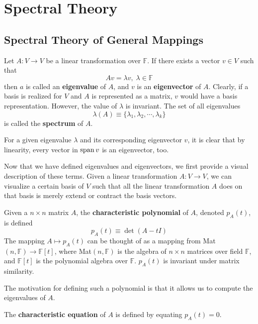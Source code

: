 \section{Spectral Theory} 

\subsection{Spectral Theory of General Mappings}

  \begin{definition}
    Let $A: V \longrightarrow V$ be a linear transformation over $\mathbb{F}$. If there exists a vector $v \in V$ such that
    \[ A v = \lambda v, \; \lambda \in \mathbb{F}\]
    then $a$ is called an \textbf{eigenvalue} of $A$, and $v$ is an \textbf{eigenvector} of $A$. Clearly, if a basis is realized for $V$ and $A$ is represented as a matrix, $v$ would have a basis representation. However, the value of $\lambda$ is invariant. The set of all eigenvalues 
    \[\lambda(A) \equiv \{ \lambda_1, \lambda_2, \cdots, \lambda_k\}\]
    is called the \textbf{spectrum} of $A$. 
  \end{definition}

  For a given eigenvalue $\lambda$ and its corresponding eigenvector $v$, it is clear that by linearity, every vector in $\operatorname{span} v$ is an eigenvector, too. 

  Now that we have defined eigenvalues and eigenvectors, we first provide a visual description of these terms. Given a linear transformation $A: V \longrightarrow V$, we can visualize a certain basis of $V$ such that all the linear transformation $A$ does on that basis is merely extend or contract the basis vectors.

  \begin{definition}
    Given a $n \times n$ matrix $A$, the \textbf{characteristic polynomial} of $A$, denoted $p_A (t)$, is defined
    \[ p_A (t) \equiv \det{(A - t I)}\]
    The mapping $A \mapsto p_A (t)$ can be thought of as a mapping from Mat$(n, \mathbb{F}) \longrightarrow \mathbb{F}[t]$, where Mat$(n, \mathbb{F})$ is the algebra of $n \times n$ matrices over field $\mathbb{F}$, and $\mathbb{F}[t]$ is the polynomial algebra over $\mathbb{F}$. $p_A (t)$ is invariant under matrix similarity. 
  \end{definition}

  The motivation for defining such a polynomial is that it allows us to compute the eigenvalues of $A$. 

  \begin{definition}
    The \textbf{characteristic equation} of $A$ is defined by equating $p_A (t) = 0$. 
  \end{definition}


